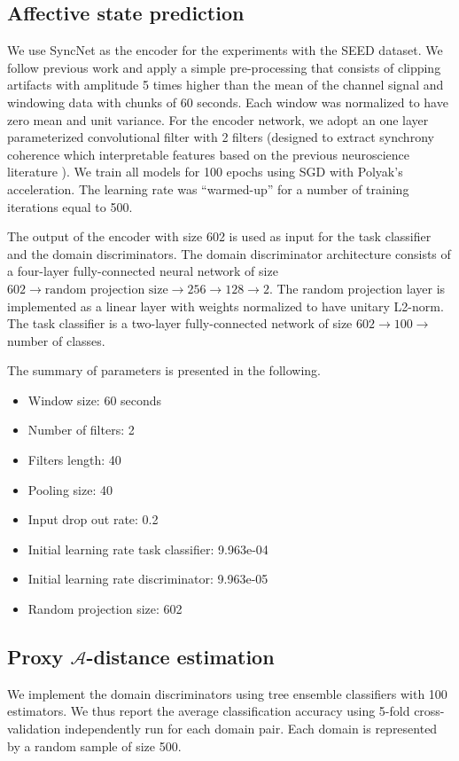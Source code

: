 \documentclass{article}
\begin{document}
\subsection{Affective state prediction}
We use SyncNet \cite{li2017targeting} as the encoder for the experiments with the SEED dataset. We follow previous work and apply a simple pre-processing that consists of clipping artifacts with amplitude 5 times higher than the mean of the channel signal and windowing data with chunks of 60 seconds. Each window was normalized to have zero mean and unit variance. For the encoder network, we adopt an one layer parameterized convolutional filter with 2 filters (designed to extract synchrony coherence which interpretable features based on the previous neuroscience literature \cite{li2017targeting}). We train all models for 100 epochs using SGD with Polyak’s acceleration. The learning rate was ``warmed-up'' for a number of training iterations equal to 500.

The output of the encoder with size 602 is used as input for the task classifier and the domain discriminators. The domain discriminator architecture consists of a four-layer fully-connected neural network of size $602 \rightarrow \text{random projection size} \rightarrow 256  \rightarrow 128 \rightarrow 2$. The random projection layer is implemented as a linear layer with weights normalized to have unitary L2-norm. The task classifier is a two-layer fully-connected network of size $602 \rightarrow 100 \rightarrow$ number of classes.

The summary of parameters is presented in the following.
\begin{itemize}
    \item Window size: 60 seconds 
    \item Number of filters: 2 
    \item Filters length: 40
    \item Pooling  size: 40 
    \item Input drop out rate: 0.2 
    \item Initial learning rate task classifier: 9.963e-04
    \item Initial learning rate discriminator: 9.963e-05
    \item Random projection size: 602
\end{itemize}

\subsection{Proxy $\mathcal{A}$-distance estimation}
We implement the domain discriminators using tree ensemble classifiers with 100 estimators. We thus report the average classification accuracy using 5-fold cross-validation independently run for each domain pair.  Each domain is represented by a random sample of size 500.
\end{document}
